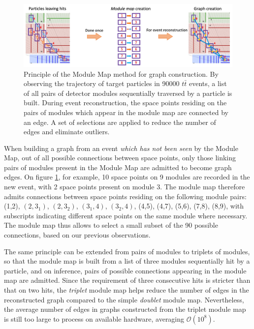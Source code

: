 \begin{figure}[h!]
    \centering
    \includegraphics[width=1\linewidth]{figures/module-map.png}
    \caption{Principle of the Module Map method for graph construction.  By observing the trajectory of target particles in 90000 $t\bar{t}$ events, a list of all pairs of detector modules sequentially traversed by a particle is built. During event reconstruction, the space points residing on the pairs of modules which appear in the module map are connected by an edge. A set of selections are applied to reduce the number of edges and eliminate outliers.}
    \label{fig:module-map}
\end{figure}

When building a graph from an event \textit{which has not been seen} by the Module Map, out of all possible connections between space points, only those linking pairs of modules present in the Module Map are admitted to become graph edges. 
On figure \ref{fig:module-map}, for example, 10 space points on 9 modules are recorded in the new event, with 2 space points present on module 3. 
The module map therefore admits connections between space points residing on the following module pairs: (1,2), $(2,3_1)$, $(2,3_2)$, $(3_1,4)$, $(3_2,4)$, (4,5), (4,7), (5,6), (7,8), (8,9), with subscripts indicating different space points on the same module where necessary. 
The module map thus allows to select a small subset of the 90 possible connections, based on our previous observations. 

The same principle can be extended from pairs of modules to triplets of modules, so that the module map is built from a list of three modules sequentially hit by a particle, and on inference, pairs of possible connections appearing in the module map are admitted. 
Since the requirement of three consecutive hits is stricter than that on two hits, the \textit{triplet} module map helps reduce the number of edges in the reconstructed graph compared to the simple \textit{doublet} module map. 
Nevertheless, the average number of edges in graphs constructed from the triplet module map is still too large to process on available hardware, averaging $\mathcal{O}(10^8)$. 

